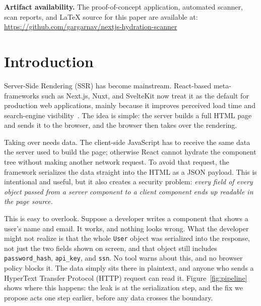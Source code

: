 \documentclass[runningheads]{llncs}
\begin{document}

\begin{footnotesize}
\textbf{Artifact availability.} The proof-of-concept application,
automated scanner, scan reports, and \LaTeX{} source for this paper are
available at:
\url{https://github.com/gargarnav/nextjs-hydration-scanner}
\end{footnotesize}

\section{Introduction}
\label{sec:intro}

Server-Side Rendering (SSR) has become mainstream.  React-based
meta-frameworks such as Next.js, Nuxt, and SvelteKit now treat it as the
default for production web applications, mainly because it improves
perceived load time and search-engine visibility~\cite{next16docs}.  The
idea is simple: the server builds a full HTML page and sends it to the
browser, and the browser then takes over the rendering.

Taking over needs data.  The client-side JavaScript has to receive the
same data the server used to build the page; otherwise React cannot
hydrate the component tree without making another network request.  To
avoid that request, the framework serializes the data straight into the
HTML as a JSON payload.  This is intentional and useful, but it also
creates a security problem: \emph{every field of every object passed from
a server component to a client component ends up readable in the page
source.}

This is easy to overlook.  Suppose a developer writes a component that
shows a user's name and email.  It works, and nothing looks wrong.  What
the developer might not realize is that the whole \texttt{User} object was
serialized into the response, not just the two fields shown on screen, and
that object still includes \texttt{password\_hash}, \texttt{api\_key}, and
\texttt{ssn}.  No tool warns about this, and no browser policy blocks it.
The data simply sits there in plaintext, and anyone who sends a HyperText
Transfer Protocol (HTTP) request can read it.  Figure~\ref{fig:pipeline}
shows where this happens: the leak is at the serialization step, and the
fix we propose acts one step earlier, before any data crosses the
boundary.
\end{document}
